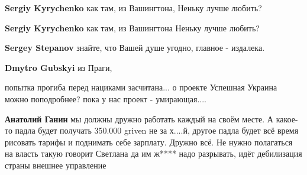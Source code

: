 \begin{itemize}
\begin{itemize}
 
\textbf{Sergiy Kyrychenko} как там, из Вашингтона, Неньку лучше любить?

 
\textbf{Sergiy Kyrychenko} как там, из Вашингтона Неньку лучше любить?

 
\textbf{Sergey Stepanov} знайте, что Вашей душе угодно, главное - издалека.

 
\textbf{Dmytro Gubskyi} из Праги,
\end{itemize}

 
попытка прогиба перед нациками засчитана... о проекте Успешная Украина можно
поподробнее? пока у нас проект - умирающая....

\begin{itemize}
 
\textbf{Анатолий Ганин} мы должны дружно работать каждый на своём месте. А какое-то падла будет получать 350.000 griven не за х....й, другое падла будет всё время рисовать тарифы и поднимать себе зарплату. Дружно всё. Не нужно полагаться на власть такую говорит Светлана да им ж**** надо разрывать, идёт дебилизация страны внешнее управление


\end{itemize}
\end{itemize}
